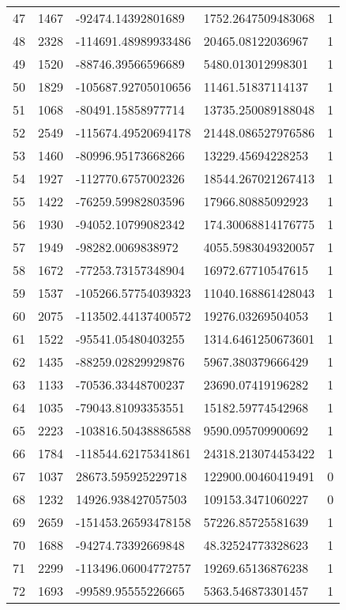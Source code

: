 \begin{longtable}{lllll}
    47 & 1467 & -92474.14392801689 & 1752.2647509483068 & 1 \\
    48 & 2328 & -114691.48989933486 & 20465.08122036967 & 1 \\
    49 & 1520 & -88746.39566596689 & 5480.013012998301 & 1 \\
    50 & 1829 & -105687.92705010656 & 11461.51837114137 & 1 \\
    51 & 1068 & -80491.15858977714 & 13735.250089188048 & 1 \\
    52 & 2549 & -115674.49520694178 & 21448.086527976586 & 1 \\
    53 & 1460 & -80996.95173668266 & 13229.45694228253 & 1 \\
    54 & 1927 & -112770.6757002326 & 18544.267021267413 & 1 \\
    55 & 1422 & -76259.59982803596 & 17966.80885092923 & 1 \\
    56 & 1930 & -94052.10799082342 & 174.30068814176775 & 1 \\
    57 & 1949 & -98282.0069838972 & 4055.5983049320057 & 1 \\
    58 & 1672 & -77253.73157348904 & 16972.67710547615 & 1 \\
    59 & 1537 & -105266.57754039323 & 11040.168861428043 & 1 \\
    60 & 2075 & -113502.44137400572 & 19276.03269504053 & 1 \\
    61 & 1522 & -95541.05480403255 & 1314.6461250673601 & 1 \\
    62 & 1435 & -88259.02829929876 & 5967.380379666429 & 1 \\
    63 & 1133 & -70536.33448700237 & 23690.07419196282 & 1 \\
    64 & 1035 & -79043.81093353551 & 15182.59774542968 & 1 \\
    65 & 2223 & -103816.50438886588 & 9590.095709900692 & 1 \\
    66 & 1784 & -118544.62175341861 & 24318.213074453422 & 1 \\
    67 & 1037 & 28673.595925229718 & 122900.00460419491 & 0 \\
    68 & 1232 & 14926.938427057503 & 109153.3471060227 & 0 \\
    69 & 2659 & -151453.26593478158 & 57226.85725581639 & 1 \\
    70 & 1688 & -94274.73392669848 & 48.32524773328623 & 1 \\
    71 & 2299 & -113496.06004772757 & 19269.65136876238 & 1 \\
    72 & 1693 & -99589.95555226665 & 5363.546873301457 & 1 \\

\end{longtable}
